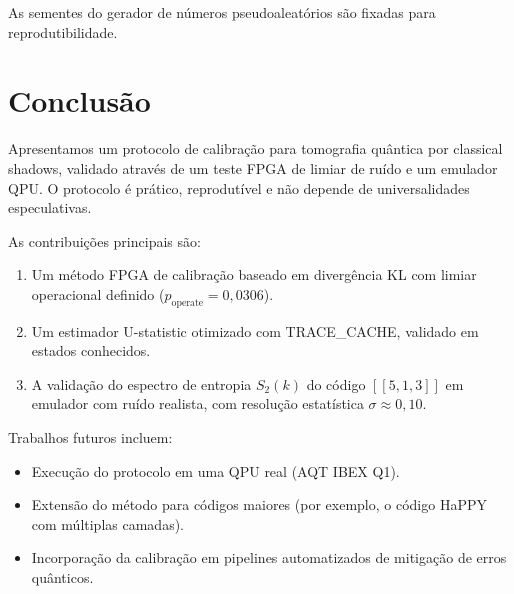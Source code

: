 \documentclass[12pt,a4paper,oneside]{book}
\theoremstyle{definition}
\theoremstyle{remark}
\begin{document}
As sementes do gerador de números pseudoaleatórios são fixadas para reprodutibilidade.

\chapter{Conclusão}\label{chap:conclusao}

Apresentamos um protocolo de calibração para tomografia quântica por classical shadows, validado através de um teste FPGA de limiar de ruído e um emulador QPU. O protocolo é prático, reprodutível e não depende de universalidades especulativas.

As contribuições principais são:
\begin{enumerate}
    \item Um método FPGA de calibração baseado em divergência KL com limiar operacional definido ($p_{\text{operate}} = 0{,}0306$).
    \item Um estimador U-statistic otimizado com TRACE\_CACHE, validado em estados conhecidos.
    \item A validação do espectro de entropia $S_2(k)$ do código $[[5,1,3]]$ em emulador com ruído realista, com resolução estatística $\sigma \approx 0{,}10$.
\end{enumerate}

Trabalhos futuros incluem:
\begin{itemize}
    \item Execução do protocolo em uma QPU real (AQT IBEX Q1).
    \item Extensão do método para códigos maiores (por exemplo, o código HaPPY com múltiplas camadas).
    \item Incorporação da calibração em pipelines automatizados de mitigação de erros quânticos.
\end{itemize}
\end{document}
